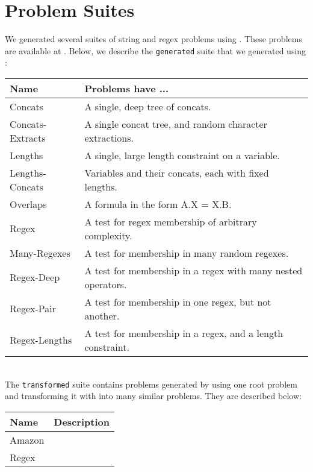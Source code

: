 \section{Problem Suites}
\label{sec:problems}

    We generated several suites of string and regex problems using \fuzzer{}. These problems are available at \problemRepo{}. Below, we describe the \texttt{generated} suite that we generated using \generator{}: \\

    \begin{tabular}{|l|l|}
        \hline
        \textbf{Name}    & \textbf{Problems have ...} \\ \hline
        Concats          & A single, deep tree of concats. \\ \hline
        Concats-Extracts & A single concat tree, and random character extractions. \\ \hline
        Lengths          & A single, large length constraint on a variable. \\ \hline
        Lengths-Concats  & Variables and their concats, each with fixed lengths. \\ \hline
        Overlaps         & A formula in the form A.X = X.B. \\ \hline
        Regex            & A test for regex membership of arbitrary complexity. \\ \hline
        Many-Regexes     & A test for membership in many random regexes. \\ \hline
        Regex-Deep       & A test for membership in a regex with many nested operators. \\ \hline
        Regex-Pair       & A test for membership in one regex, but not another. \\ \hline
        Regex-Lengths    & A test for membership in a regex, and a length constraint. \\ \hline
    \end{tabular}
    \hfill \\

    The \texttt{transformed} suite contains problems generated by using one root problem and transforming it with \transformer{} into many similar problems. They are described below:


    \begin{tabular}{|l|l|}
        \hline
        \textbf{Name} & \textbf{Description} \\ \hline
        Amazon        & \\ \hline
        Regex         & \\ \hline
    \end{tabular}

